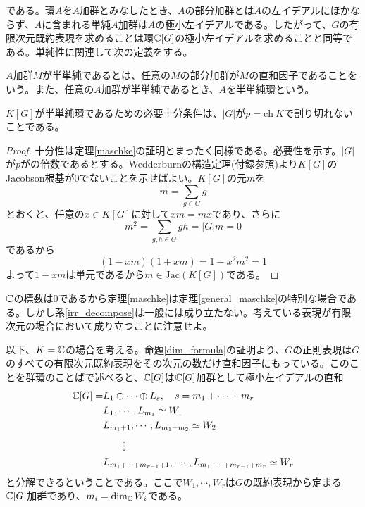 \documentclass{ltjsreport}
\begin{document}
である。環$A$を$A$加群とみなしたとき、$A$の部分加群とは$A$の左イデアルにほかならず、$A$に含まれる単純$A$加群は$A$の極小左イデアルである。したがって、$G$の有限次元既約表現を求めることは環$\mathbb{C}[G]$の極小左イデアルを求めることと同等である。単純性に関連して次の定義をする。

\begin{defin}
  $A$加群$M$が半単純であるとは、任意の$M$の部分加群が$M$の直和因子であることをいう。また、任意の$A$加群が半単純であるとき、$A$を半単純環という。
\end{defin}

\begin{theo}[Maschkeの定理]\label{general_maschke}
  $K[G]$が半単純環であるための必要十分条件は、$|G|$が$p=\text{ch}\:K$で割り切れないことである。
\end{theo}

\begin{proof}
  十分性は定理\ref{maschke}の証明とまったく同様である。必要性を示す。$|G|$が$p$がの倍数であるとする。Wedderburnの構造定理(付録参照)より$K[G]$のJacobson根基が0でないことを示せばよい。$K[G]$の元$m$を
  \[
  m=\sum_{g\in G}g  
  \]
  とおくと、任意の$x\in K[G]$に対して$xm=mx$であり、さらに
  \[
  m^2=\sum_{g,h\in G}gh=|G|m=0  
  \]
  であるから
  \[
  (1-xm)(1+xm)=1-x^2m^2=1  
  \]
  よって$1-xm$は単元であるから$m\in\text{Jac}(K[G])$である。
\end{proof}


$\mathbb{C}$の標数は0であるから定理\ref{maschke}は定理\ref{general_maschke}の特別な場合である。しかし系\ref{irr_decompose}は一般には成り立たない。考えている表現が有限次元の場合において成り立つことに注意せよ。

以下、$K=\mathbb{C}$の場合を考える。命題\ref{dim_formula}の証明より、$G$の正則表現は$G$のすべての有限次元既約表現をその次元の数だけ直和因子にもっている。このことを群環のことばで述べると、$\mathbb{C}[G]$は$\mathbb{C}[G]$加群として極小左イデアルの直和
\begin{align*}
\mathbb{C}[G]=&L_1\oplus\cdots\oplus L_s,\quad s=m_1+\cdots+m_r\\
&L_1,\cdots,L_{m_1}\simeq W_1\\
&L_{m_1+1},\cdots,L_{m_1+m_2}\simeq W_2\\
&\qquad \vdots\\
&L_{m_1+\cdots+m_{r-1}+1},\cdots,L_{m_1+\cdots+m_{r-1}+m_r}\simeq W_r
\end{align*}
と分解できるということである。ここで$W_1,\cdots,W_r$は$G$の既約表現から定まる$\mathbb{C}[G]$加群であり、$m_i=\dim_{\mathbb{C}}W_i$である。
\end{document}
